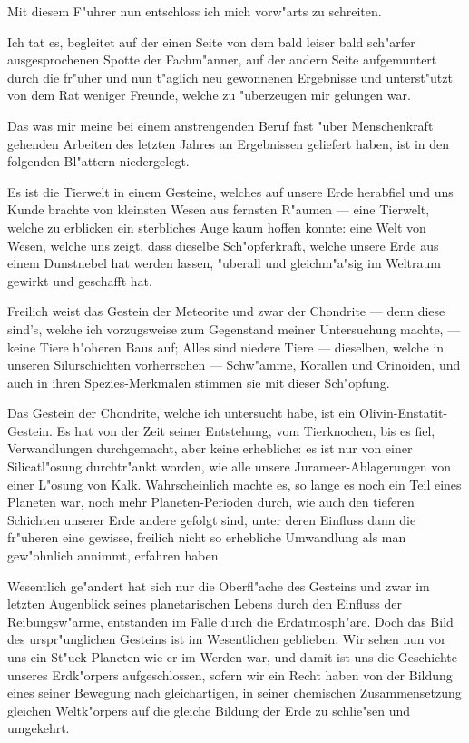 \documentclass[a4paper, 11pt, oneside]{article}
\begin{document}
Mit diesem F"uhrer nun entschloss ich mich vorw"arts zu schreiten.

Ich tat es, begleitet auf der einen Seite von dem bald leiser bald sch"arfer ausgesprochenen Spotte der Fachm"anner, auf der andern Seite aufgemuntert durch die fr"uher und nun t"aglich neu gewonnenen Ergebnisse und unterst"utzt von dem Rat weniger Freunde, welche zu "uberzeugen mir gelungen war.

Das was mir meine bei einem anstrengenden Beruf fast "uber Menschenkraft gehenden Arbeiten des letzten Jahres an Ergebnissen geliefert haben, ist in den folgenden Bl"attern niedergelegt.

Es ist die Tierwelt in einem Gesteine, welches auf unsere Erde herabfiel und uns Kunde brachte von kleinsten Wesen aus fernsten R"aumen --- eine Tierwelt, welche zu erblicken ein sterbliches Auge kaum hoffen konnte: eine Welt von Wesen, welche uns zeigt, dass dieselbe Sch"opferkraft, welche unsere Erde aus einem Dunstnebel hat werden lassen, "uberall und gleichm"a"sig im Weltraum gewirkt und geschafft hat.

Freilich weist das Gestein der Meteorite und zwar der Chondrite --- denn diese sind's, welche ich vorzugsweise zum Gegenstand meiner Untersuchung machte, --- keine Tiere h"oheren Baus auf; Alles sind niedere Tiere --- dieselben, welche in unseren Silurschichten vorherrschen --- Schw"amme, Korallen und Crinoiden, und auch in ihren Spezies-Merkmalen stimmen sie mit dieser Sch"opfung.

Das Gestein der Chondrite, welche ich untersucht habe, ist ein Olivin-Enstatit-Gestein. Es hat von der Zeit seiner Entstehung, vom Tierknochen, bis es fiel, Verwandlungen durchgemacht, aber keine erhebliche: es ist nur von einer Silicatl"osung durchtr"ankt worden, wie alle unsere Jurameer-Ablagerungen von einer L"osung von Kalk. Wahrscheinlich machte es, so lange es noch ein Teil eines Planeten war, noch mehr Planeten-Perioden durch, wie auch den tieferen Schichten unserer Erde andere gefolgt sind, unter deren Einfluss dann die fr"uheren eine gewisse, freilich nicht so erhebliche Umwandlung als man gew"ohnlich annimmt, erfahren haben.

Wesentlich ge"andert hat sich nur die Oberfl"ache des Gesteins und zwar im letzten Augenblick seines planetarischen Lebens durch den Einfluss der Reibungsw"arme, entstanden im Falle durch die Erdatmosph"are. Doch das Bild des urspr"unglichen Gesteins ist im Wesentlichen geblieben. Wir sehen nun vor uns ein St"uck Planeten wie er im Werden war, und damit ist uns die Geschichte unseres Erdk"orpers aufgeschlossen, sofern wir ein Recht haben von der Bildung eines seiner Bewegung nach gleichartigen, in seiner chemischen Zusammensetzung gleichen Weltk"orpers auf die gleiche Bildung der Erde zu schlie"sen und umgekehrt.
\end{document}
